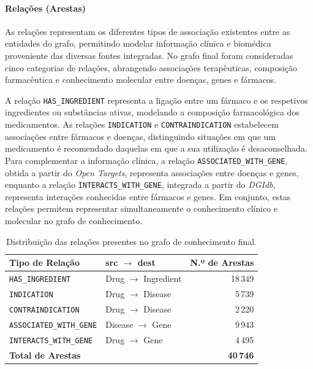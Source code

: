 \paragraph{Relações (Arestas)}
As relações representam os diferentes tipos de associação existentes entre as entidades do grafo, permitindo modelar informação clínica e biomédica proveniente das diversas fontes integradas. No grafo final foram consideradas cinco categorias de relações, abrangendo associações terapêuticas, composição farmacêutica e conhecimento molecular entre doenças, genes e fármacos.

A relação \texttt{HAS\_INGREDIENT} representa a ligação entre um fármaco e os respetivos ingredientes ou substâncias ativas, modelando a composição farmacológica dos medicamentos. As relações \texttt{INDICATION} e \texttt{CONTRAINDICATION} estabelecem associações entre fármacos e doenças, distinguindo situações em que um medicamento é recomendado daquelas em que a sua utilização é desaconselhada. Para complementar a informação clínica, a relação \texttt{ASSOCIATED\_WITH\_GENE}, obtida a partir do \emph{Open Targets}, representa associações entre doenças e genes, enquanto a relação \texttt{INTERACTS\_WITH\_GENE}, integrada a partir do \emph{DGIdb}, representa interações conhecidas entre fármacos e genes. Em conjunto, estas relações permitem representar simultaneamente o conhecimento clínico e molecular no grafo de conhecimento.

\begin{table}[H]
\centering
\caption{Distribuição das relações presentes no grafo de conhecimento final.}
\label{tab:stats_relacoes}
\begin{tabular}{|l|l|r|}
\hline
\rowcolor[HTML]{EFEFEF}
\textbf{Tipo de Relação} & \textbf{src $\rightarrow$ dest} & \textbf{N.º de Arestas} \\ \hline
\texttt{HAS\_INGREDIENT} & Drug $\rightarrow$ Ingredient & 18\,349 \\ \hline
\texttt{INDICATION} & Drug $\rightarrow$ Disease & 5\,739 \\ \hline
\texttt{CONTRAINDICATION} & Drug $\rightarrow$ Disease & 2\,220 \\ \hline
\texttt{ASSOCIATED\_WITH\_GENE} & Disease $\rightarrow$ Gene & 9\,943 \\ \hline
\texttt{INTERACTS\_WITH\_GENE} & Drug $\rightarrow$ Gene & 4\,495 \\ \hline
\hline
\textbf{Total de Arestas} & & \textbf{40\,746} \\ \hline
\end{tabular}
\end{table}

